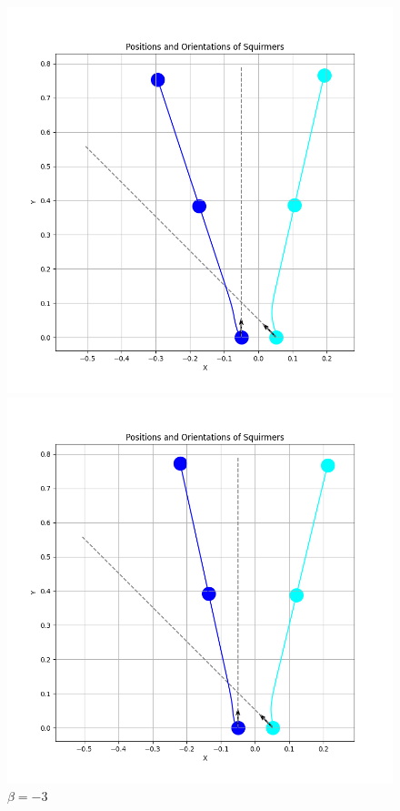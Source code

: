 \documentclass{article}
\begin{document}
\begin{figure}[H]
    \centering
    \begin{minipage}{0.49\textwidth}
        \includegraphics[width=1.1\textwidth]{graphs/simulations/sim_sq_sq/betam1_5/3pi_4_.png}
        \caption{\footnotesize $\beta = -1.5$}
    \end{minipage}\hfill
    \begin{minipage}{0.49\textwidth}
        \includegraphics[width=1.1\textwidth]{graphs/simulations/sim_sq_sq/betam3/3pi_4_.png}
        \caption{\footnotesize $\beta = -3$}
    \end{minipage}
\end{figure}
\end{document}
